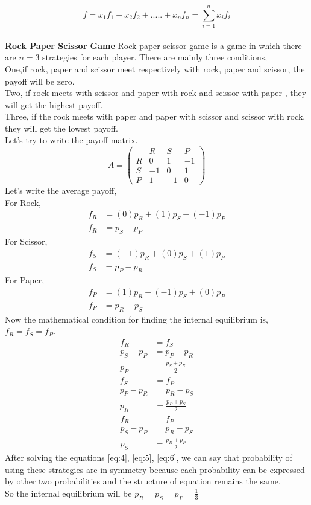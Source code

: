 \documentclass{article}
\begin{document}
\[\bar{f}=x_1f_1+x_2f_2+.....+x_nf_n= \sum_{i=1}^{n}x_if_i \]\\
\textbf{Rock Paper Scissor Game}
\newline
Rock paper scissor game is a game in which there are $n=3$ strategies for each player. There are mainly three conditions,\\
One,if rock, paper and scissor meet respectively with rock, paper and scissor, the payoff will be zero. \\
Two, if rock meets with scissor and paper with rock and scissor with paper , they will get the highest payoff.\\
Three, if the rock meets with paper and paper with scissor and scissor with rock, they will get the lowest payoff.\\
Let's try to write the payoff matrix.\\
\[
A =
\begin{pmatrix}
  & R & S & P \\
R & 0 & 1 & -1 \\
S & -1 & 0 & 1 \\
P & 1 & -1 & 0
\end{pmatrix}
\]
Let's write the average payoff,\\
For Rock,
\begin{align}
f_R &= (0)p_R + (1)p_S + (-1)p_P \nonumber\\
f_R &= p_S - p_P \nonumber
\end{align}
For Scissor,
\begin{align}
f_S &= (-1)p_R + (0)p_S + (1)p_P \nonumber\\
f_S &= p_P - p_R \nonumber
\end{align}
For Paper,
\begin{align}
f_P &= (1)p_R + (-1)p_S + (0)p_P \nonumber\\
f_P &= p_R - p_S \nonumber
\end{align}
Now the mathematical condition for finding the internal equilibrium is,$f_R=f_S=f_P$.
\begin{align}
f_R &=f_S \nonumber\\
p_S-p_P &=p_P-p_R \nonumber\\
p_P &= \frac{p_S+p_R}{2} \label{eq:4}
\end{align}
\begin{align}
f_S &=f_P \nonumber\\
p_P-p_R &=p_R-p_S \nonumber\\
p_R &= \frac{p_P+p_S}{2} \label{eq:5}
\end{align}
\begin{align}
f_R &=f_P \nonumber\\
p_S-p_P &=p_R-p_S \nonumber\\
p_S &= \frac{p_R+p_P}{2} \label{eq:6}
\end{align}
After solving the equations \ref{eq:4}, \ref{eq:5}, \ref{eq:6}, we can say that probability of using these strategies are in symmetry because each probability can be expressed by other two probabilities and the structure of equation remains the same.\\
So the internal equilibrium will be $p_R=p_S=p_P=\frac{1}{3}$
\end{document}
